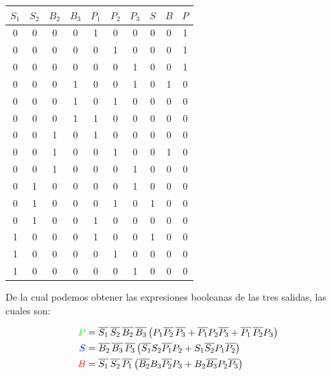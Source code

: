 \begin{center}
    \begin{tabular}{|c c c c|c c c|c c c|}
        \hline
        $S_1$ & $S_2$ & $B_2$ & $B_3$ & $P_1$ & $P_2$ & $P_3$ & $S$ & $B$ & $P$ \\
        \hline
        \rowcolor{green!30}
        0 & 0 & 0 & 0 & 1 & 0 & 0 & 0 & 0 & 1 \\
        \rowcolor{green!30}
        0 & 0 & 0 & 0 & 0 & 1 & 0 & 0 & 0 & 1 \\
        \rowcolor{green!30}
        0 & 0 & 0 & 0 & 0 & 0 & 1 & 0 & 0 & 1 \\
        \rowcolor{red!30}
        0 & 0 & 0 & 1 & 0 & 0 & 1 & 0 & 1 & 0 \\
        0 & 0 & 0 & 1 & 0 & 1 & 0 & 0 & 0 & 0 \\
        0 & 0 & 0 & 1 & 1 & 0 & 0 & 0 & 0 & 0 \\
        0 & 0 & 1 & 0 & 1 & 0 & 0 & 0 & 0 & 0 \\
        \rowcolor{red!30}
        0 & 0 & 1 & 0 & 0 & 1 & 0 & 0 & 1 & 0 \\
        0 & 0 & 1 & 0 & 0 & 0 & 1 & 0 & 0 & 0 \\
        0 & 1 & 0 & 0 & 0 & 0 & 1 & 0 & 0 & 0 \\
        \rowcolor{blue!30}
        0 & 1 & 0 & 0 & 0 & 1 & 0 & 1 & 0 & 0 \\
        0 & 1 & 0 & 0 & 1 & 0 & 0 & 0 & 0 & 0 \\
        \rowcolor{blue!30}
        1 & 0 & 0 & 0 & 1 & 0 & 0 & 1 & 0 & 0 \\
        1 & 0 & 0 & 0 & 0 & 1 & 0 & 0 & 0 & 0 \\
        1 & 0 & 0 & 0 & 0 & 0 & 1 & 0 & 0 & 0 \\
        \hline
    \end{tabular}
\end{center}

De la cual podemos obtener las expresiones booleanas de las tres salidas, las cuales son:

\begin{align}
\textcolor{green}{P} &= \overline{S_1}\,\overline{S_2}\,\overline{B_2}\,\overline{B_3}\left(P_1\overline{P_2}\,\overline{P_3} + \overline{P_1}P_2\overline{P_3} + \overline{P_1}\,\overline{P_2}P_3\right) \\
\textcolor{blue}{S} &= \overline{B_2}\,\overline{B_3}\,\overline{P_3}\left(\overline{S_1}S_2\overline{P_1}P_2 + S_1\overline{S_2}P_1\overline{P_2}\right) \\
\textcolor{red}{B} &= \overline{S_1}\,\overline{S_2}\,\overline{P_1}\left(\overline{B_2}B_3\overline{P_2}P_3 + B_2\overline{B_3}P_2\overline{P_3}\right)
\end{align}

